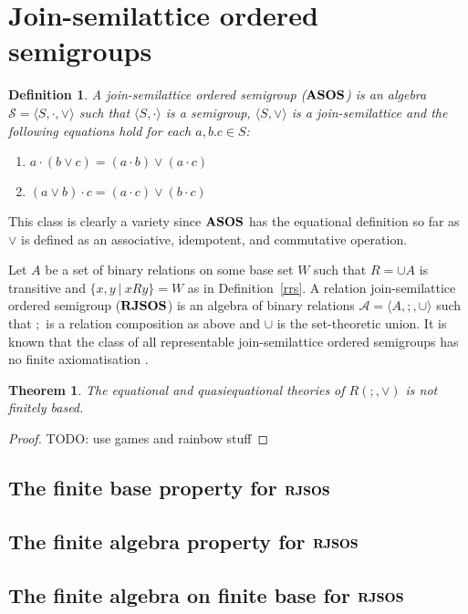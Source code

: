 \documentclass[a4paper]{article}
\theoremstyle{defin}
\newtheorem{defin}{Definition}
\theoremstyle{theorem}
\newtheorem{theorem}{Theorem}
\theoremstyle{prop}
\theoremstyle{lemma}
\theoremstyle{ex}
\theoremstyle{col}
\begin{document}
\section{Join-semilattice ordered semigroups}

\begin{defin} A join-semilattice ordered semigroup (${\bf ASOS}$) is an algebra $\mathcal{S} = \langle S, \cdot, \vee \rangle$ such that $\langle S, \cdot \rangle$ is a semigroup, $\langle S, \vee \rangle$ is a join-semilattice and the following equations hold for each $a, b. c \in S$:

  \begin{enumerate}
    \item $a \cdot (b \vee c) = (a \cdot b) \vee (a \cdot c)$
    \item $(a \vee b) \cdot c = (a \cdot c) \vee (b \cdot c)$
  \end{enumerate}
\end{defin}
This class is clearly a variety since ${\bf ASOS}$ has the equational definition so far as $\vee$ is defined as an associative, idempotent, and commutative operation.

Let $A$ be a set of binary relations on some base set $W$ such that $R = \cup A$ is transitive and $\{ x, y \: | \: x R y \} = W$ as in Definition~\ref{rrs}. A relation join-semilattice ordered semigroup (${\bf RJSOS}$) is an algebra of binary relations $\mathcal{A} = \langle A, ;, \cup\rangle$ such that $;$ is a relation composition as above and $\cup$ is the set-theoretic union. It is known that the class of all representable join-semilattice ordered semigroups has no finite axiomatisation \cite{andreka1989union}.

\begin{theorem}
  The equational and quasiequational theories of $R(;,\vee)$ is not finitely based.
\end{theorem}

\begin{proof}
TODO: use games and rainbow stuff
\end{proof}

\subsection{The finite base property for ${\bf RJSOS}$}

\subsection{The finite algebra property for ${\bf RJSOS}$}

\subsection{The finite algebra on finite base for ${\bf RJSOS}$}



\end{document}
